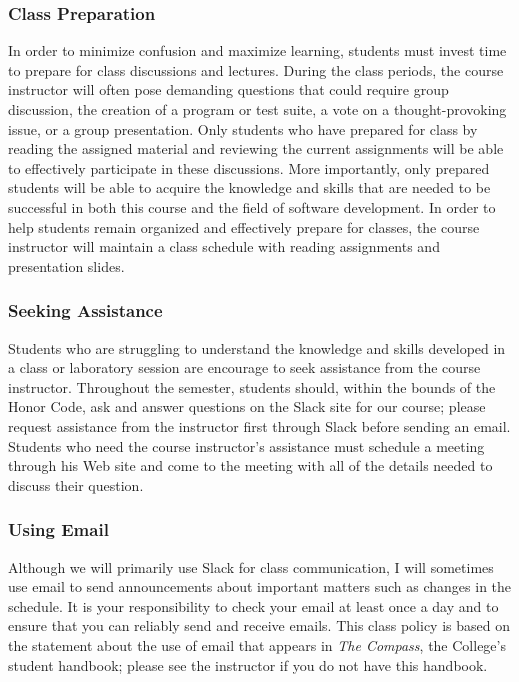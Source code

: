 \subsubsection*{Class Preparation}

In order to minimize confusion and maximize learning, students must invest time to prepare for class discussions and
lectures.  During the class periods, the course instructor will often pose demanding questions that could require group
discussion, the creation of a program or test suite, a vote on a thought-provoking issue, or a group presentation.
Only students who have prepared for class by reading the assigned material and reviewing the current assignments will be
able to effectively participate in these discussions.  More importantly, only prepared students will be able to acquire
the knowledge and skills that are needed to be successful in both this course and the field of software development.  In
order to help students remain organized and effectively prepare for classes, the course instructor will maintain a class
schedule with reading assignments and presentation slides.


\subsubsection*{Seeking Assistance}

Students who are struggling to understand the knowledge and skills developed in a class or laboratory session are
encourage to seek assistance from the course instructor. Throughout the semester, students should, within the bounds of
the Honor Code, ask and answer questions on the Slack site for our course; please request assistance from the instructor
first through Slack before sending an email. Students who need the course instructor's assistance must schedule a
meeting through his Web site and come to the meeting with all of the details needed to discuss their question.

\subsubsection*{Using Email}

Although we will primarily use Slack for class communication, I will sometimes use email to send announcements about
important matters such as changes in the schedule. It is your responsibility to check your email at least once a day and to
ensure that you can reliably send and receive emails. This class policy is based on the statement about the use of email that
appears in {\em The Compass}, the College's student handbook; please see the instructor if you do not have this
handbook.

